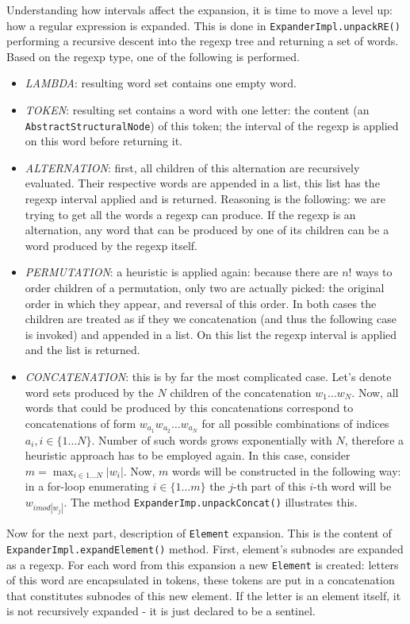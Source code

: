 \documentclass[a4paper,10pt,oneside]{article}
\newcommand{\code}[1]{\texttt{#1}}
\begin{document}
Understanding how intervals affect the expansion, it is time to move a level up: how a regular expression is expanded. This is done in \code{ExpanderImpl.unpackRE()} performing a recursive descent into the regexp tree and returning a set of words. Based on the regexp type, one of the following is performed.
\begin{itemize}
	\item \emph{LAMBDA}: resulting word set contains one empty word.
	\item \emph{TOKEN}: resulting set contains a word with one letter: the content (an \code{AbstractStructuralNode}) of this token; the interval of the regexp is applied on this word before returning it.
	\item \emph{ALTERNATION}: first, all children of this alternation are recursively evaluated. Their respective words are appended in a list, this list has the regexp interval applied and is returned. Reasoning is the following: we are trying to get all the words a regexp can produce. If the regexp is an alternation, any word that can be produced by one of its children can be a word produced by the regexp itself.
	\item \emph{PERMUTATION}: a heuristic is applied again: because there are $n!$ ways to order children of a permutation, only two are actually picked: the original order in which they appear, and reversal of this order. In both cases the children are treated as if they we concatenation (and thus the following case is invoked) and appended in a list. On this list the regexp interval is applied and the list is returned.
	\item \emph{CONCATENATION}: this is by far the most complicated case. Let's denote word sets produced by the $N$ children of the concatenation $ w_1 \ldots w_N $. Now, all words that could be produced by this concatenations correspond to concatenations of form $w_{a_1} w_{a_2} \ldots w_{a_N}$ for all possible combinations of indices $a_i, i  \in \{1 \ldots N\}$. Number of such words grows exponentially with $N$, therefore a heuristic approach has to be employed again.\newline
In this case, consider $ m = \max_{i \in 1 \ldots N}{|w_i|} $. Now, $ m $ words will be constructed in the following way: in a for-loop enumerating $ i \in \{1 \ldots m\}$ the $j$-th part of this $i$-th word will be $w_{i mod |w_j|}$. The method \code{ExpanderImp.unpackConcat()} illustrates this.
\end{itemize}

Now for the next part, description of \code{Element} expansion. This is the content of \code{ExpanderImpl.expandElement()} method. First, element's subnodes are expanded as a regexp. For each word from this expansion a new \code{Element} is created: letters of this word are encapsulated in tokens, these tokens are put in a concatenation that constitutes subnodes of this new element. If the letter is an element itself, it is not recursively expanded - it is just declared to be a sentinel.\\ %
\end{document}

